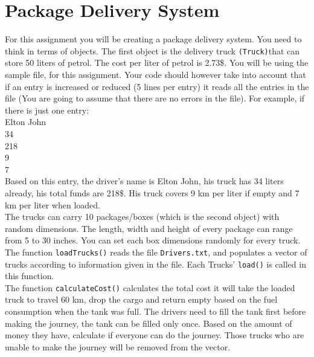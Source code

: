 \documentclass[a4paper,12pt]{article}
\begin{document}
\section{Package Delivery System}
For this assignment you will be creating a package delivery system. You need to think in terms of objects.	The first object is the delivery truck \texttt{(Truck)}that can store 50 liters of petrol. The cost per liter of petrol is 2.73\$.	You will be using the sample file,  for this assignment. Your code should however take into account that if an entry is increased or reduced (5 lines per entry) it reads all the entries in the file (You are going to assume that there are no errors in the file). For example, if there is just one entry:\smallskip\\

\noindent Elton John\\
34\\
218\\
9\\
7\\



\noindent Based on this entry, the driver's name is Elton John, his truck has 34 liters already, his total funds are	218\$. His truck covers 9 km per liter if empty and 7 km per liter when loaded.\\

\noindent The trucks can carry 10 packages/boxes (which is the second object) with random dimensions. The length, width and height of every package can range from 5 to 30 inches. You can set each box dimensions randomly for every truck. \smallskip\\

\noindent The function \texttt{loadTrucks()} reads the file \texttt{Drivers.txt}, and populates a vector of trucks according to information given in the file. Each Trucks' \texttt{load()} is called in this function. \smallskip\\

\noindent The function \texttt{calculateCost()} calculates the total cost it will take the loaded truck to travel 60 km, drop the cargo and return empty based on the fuel consumption when the tank was full. The drivers need to fill the tank first before making the journey, the tank can be filled only once. Based on the amount of money they have, calculate if everyone can do the journey. Those trucks who are unable to make the journey will be removed from the vector. \\
\end{document}
